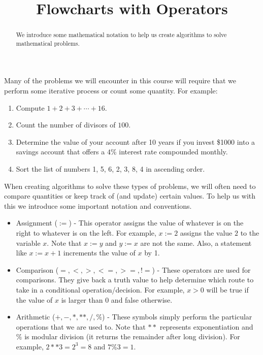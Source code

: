\documentclass{ximera}
\title{Flowcharts with Operators}
\begin{document}
  
\begin{abstract}  
We introduce some mathematical notation to help us create algorithms to solve mathematical problems. 
\end{abstract}  
\maketitle

Many of the problems we will encounter in this course will require that we perform some iterative process or count some quantity. For example:

\begin{enumerate}
	\item Compute $1+2+3+\cdots+16$.
	\item Count the number of divisors of $100$.
	\item Determine the value of your account after 10 years if you invest \$1000 into a savings account that offers a $4$\% interest rate compounded monthly.
	\item Sort the list of numbers 1, 5, 6, 2, 3, 8, 4 in ascending order.
\end{enumerate}

When creating algorithms to solve these types of problems, we will often need to compare quantities or keep track of (and update) certain values. To help us with this we introduce some important notation and conventions.

\begin{itemize}
	\item Assignment ($:=$) - This operator assigns the value of whatever is on the right to whatever is on the left. For example, $x:=2$ assigns the value $2$ to the variable $x$. Note that $x:=y$ and $y:=x$ are not the same. Also, a statement like $x:=x+1$ increments the value of $x$ by 1.
	\item Comparison ($=,<,>,<=,>=,!=$) - These operators are used for comparisons. They give back a truth value to help determine which route to take in a conditional operation/decision. For example, $x>0$ will be true if the value of $x$ is larger than $0$ and false otherwise.
	\item Arithmetic ($+,-,*,**,/,\%$) - These symbols simply perform the particular operations that we are used to. Note that $**$ represents exponentiation and $\%$ is modular division (it returns the remainder after long division). For example, $2**3 = 2^3 = 8$ and $7\%3 = 1$.
\end{itemize}
\end{document}
